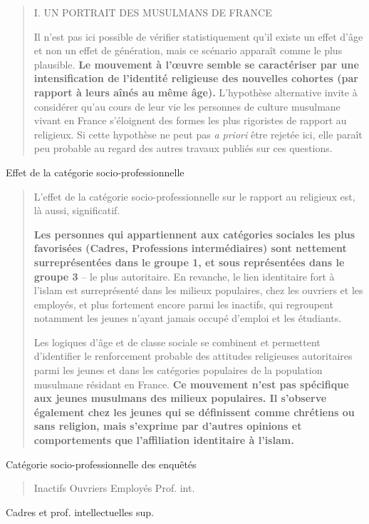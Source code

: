 \begin{quote}
I. UN PORTRAIT DES MUSULMANS DE FRANCE

Il n'est pas ici possible de vérifier statistiquement qu'il existe un
effet d'âge et non un effet de génération, mais ce scénario apparaît
comme le plus plausible. \textbf{Le mouvement à l'œuvre semble se
caractériser par une intensification de l'identité religieuse des
nouvelles cohortes (par rapport à leurs aînés au même âge).} L'hypothèse
alternative invite à considérer qu'au cours de leur vie les personnes de
culture musulmane vivant en France s'éloignent des formes les plus
rigoristes de rapport au religieux. Si cette hypothèse ne peut pas
\emph{a priori} être rejetée ici, elle paraît peu probable au regard des
autres travaux publiés sur ces questions.
\end{quote}

Effet de la catégorie socio-professionnelle

\begin{quote}
L'effet de la catégorie socio-professionnelle sur le rapport au
religieux est, là aussi, significatif.

\textbf{Les personnes qui appartiennent aux catégories sociales les plus
favorisées (Cadres, Professions intermédiaires) sont nettement
surreprésentées dans le groupe 1, et sous représentées dans le groupe 3}
-- le plus autoritaire. En revanche, le lien identitaire fort à l'islam
est surreprésenté dans les milieux populaires, chez les ouvriers et les
employés, et plus fortement encore parmi les inactifs, qui regroupent
notamment les jeunes n'ayant jamais occupé d'emploi et les étudiants.

Les logiques d'âge et de classe sociale se combinent et permettent
d'identifier le renforcement probable des attitudes religieuses
autoritaires parmi les jeunes et dans les catégories populaires de la
population musulmane résidant en France. \textbf{Ce mouvement n'est pas
spécifique aux jeunes musulmans des milieux populaires. Il s'observe
également chez les jeunes qui se définissent comme chrétiens ou sans
religion, mais s'exprime par d'autres opinions et comportements que
l'affiliation identitaire à l'islam.}
\end{quote}

Catégorie socio-professionnelle des enquêtés

\begin{quote}
Inactifs Ouvriers Employés Prof. int.
\end{quote}

Cadres et prof. intellectuelles sup.

